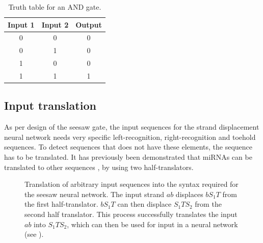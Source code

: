 \begin{table}[]
\centering
\begin{tabular}{ccc}
  \hline
\multicolumn{1}{l}{\textbf{Input 1}} & \multicolumn{1}{l}{\textbf{Input 2}} & \multicolumn{1}{l}{\textbf{Output}} \\
\hline
0                                    & 0                                    & 0                                   \\
0                                    & 1                                    & 0                                   \\
1                                    & 0                                    & 0                                   \\
1                                    & 1                                    & 1 \\
\hline
\end{tabular}
\caption{Truth table for an AND gate.}
\label{and_table}
\end{table}

\subsection{Input translation}

As per design of the seesaw gate, the input sequences for the strand displacement neural network needs very specific left-recognition, right-recognition and toehold sequences. To detect sequences that does not have these elements, the sequence has to be translated. It has previously been demonstrated that miRNAs can be translated to other sequences \cite{Picuri2009}, by using two half-translators.

\begin{figure}[H]
    \centering
{} {

}
\caption{Translation of arbitrary input sequences into the syntax required for the seesaw neural network. The input strand $ab$ displaces $bS_1T$ from the first half-translator. $bS_1T$ can then displace $S_1TS_2$ from the second half translator. This process successfully translates the input $ab$ into $S_1TS_2$, which can then be used for input in a neural network (see ).}
\label{translator}
\end{figure}
